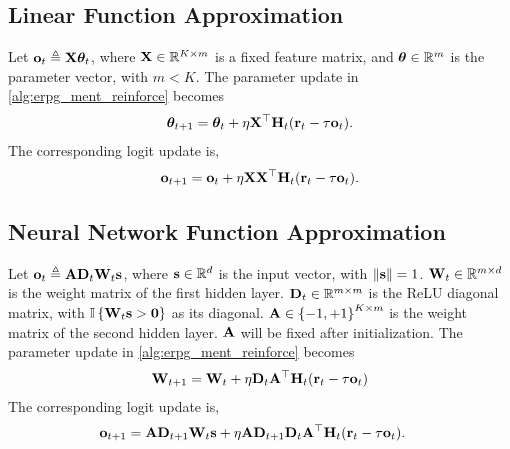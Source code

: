 \subsection{Linear Function Approximation}

Let ${\mathbf{o}}_t \triangleq {\mathbf{X}} {\boldsymbol{\theta}}_t$, where ${\mathbf{X}} \in {\mathbb{R}}^{K \times m}$ is a fixed feature matrix, and ${\boldsymbol{\theta}} \in {\mathbb{R}}^m$ is the parameter vector, with $m < K$. The parameter update in \cref{alg:erpg_ment_reinforce} becomes
\begin{equation*}
\begin{split}
    {\boldsymbol{\theta}}_{t+1} = {\boldsymbol{\theta}}_{t} + \eta {\mathbf{X}}^\top {\mathbf{H}}_t ({\mathbf{r}}_t - \tau {\mathbf{o}}_t).
\end{split}
\end{equation*}
The corresponding logit update is,
\begin{equation*}
\begin{split}
    {\mathbf{o}}_{t+1} = {\mathbf{o}}_{t} + \eta {\mathbf{X}} {\mathbf{X}}^\top {\mathbf{H}}_t ({\mathbf{r}}_t - \tau {\mathbf{o}}_t).
\end{split}
\end{equation*}

\subsection{Neural Network Function Approximation}

Let ${\mathbf{o}}_t \triangleq {\mathbf{A}} {\mathbf{D}}_t {\mathbf{W}}_t {\mathbf{s}}$, where ${\mathbf{s}} \in {\mathbb{R}}^d$ is the input vector, with $\| {\mathbf{s}} \| = 1$. ${\mathbf{W}}_t \in {\mathbb{R}}^{m \times d}$ is the weight matrix of the first hidden layer. ${\mathbf{D}}_t \in {\mathbb{R}}^{m \times m}$ is the ReLU diagonal matrix, with ${\mathbb{I}}\left\{ {\mathbf{W}}_t {\mathbf{s}} > {\mathbf{0}} \right\}$ as its diagonal. ${\mathbf{A}} \in \left\{ -1, +1 \right\}^{K \times m}$ is the weight matrix of the second hidden layer. ${\mathbf{A}}$ will be fixed after initialization. The parameter update in \cref{alg:erpg_ment_reinforce} becomes
\begin{equation*}
\begin{split}
    {\mathbf{W}}_{t+1} = {\mathbf{W}}_{t} + \eta {\mathbf{D}}_t {\mathbf{A}}^\top {\mathbf{H}}_t ( {\mathbf{r}}_t - \tau {\mathbf{o}}_t)
\end{split}
\end{equation*}
The corresponding logit update is,
\begin{equation*}
\begin{split}
    {\mathbf{o}}_{t+1} &= {\mathbf{A}} {\mathbf{D}}_{t+1} {\mathbf{W}}_{t} {\mathbf{s}} + \eta {\mathbf{A}} {\mathbf{D}}_{t+1} {\mathbf{D}}_{t} {\mathbf{A}}^\top {\mathbf{H}}_t ({\mathbf{r}}_t - \tau {\mathbf{o}}_t).
\end{split}
\end{equation*}
